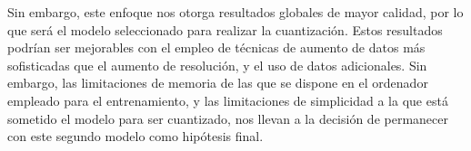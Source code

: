 Sin embargo, este enfoque nos otorga resultados globales de mayor calidad, por lo que será el modelo seleccionado para realizar la cuantización. Estos resultados podrían ser mejorables con el empleo de técnicas de aumento de datos más sofisticadas que el aumento de resolución, y el uso de datos adicionales. Sin embargo, las limitaciones de memoria de las que se dispone en el ordenador empleado para el entrenamiento,  y las limitaciones de simplicidad a la que está sometido el modelo para ser cuantizado, nos llevan a la decisión de permanecer con este segundo modelo como hipótesis final.

